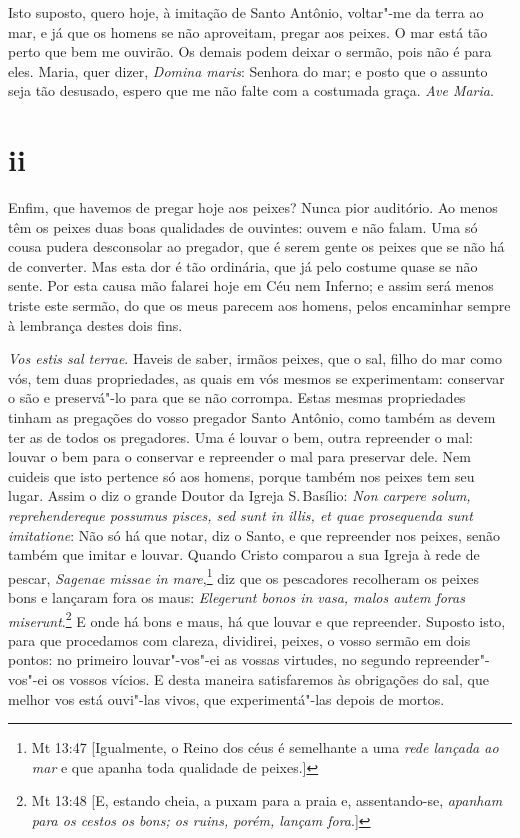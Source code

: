 Isto suposto, quero hoje, à imitação de Santo Antônio, voltar"-me da
terra ao mar, e já que os homens se não aproveitam, pregar aos peixes. O
mar está tão perto que bem me ouvirão. Os demais podem deixar o sermão,
pois não é para eles. Maria, quer dizer, \emph{Domina maris}: Senhora
do mar; e posto que o assunto seja tão desusado, espero que me não
falte com a costumada graça. \emph{Ave Maria}.

\section*{ii}

Enfim, que havemos de pregar hoje aos peixes? Nunca pior auditório. Ao
menos têm os peixes duas boas qualidades de ouvintes: ouvem e não falam.
Uma só cousa pudera desconsolar ao pregador, que é serem gente os peixes
que se não há de converter. Mas esta dor é tão ordinária, que já pelo
costume quase se não sente. Por esta causa mão falarei hoje em Céu nem
Inferno; e assim será menos triste este sermão, do que os meus parecem
aos homens, pelos encaminhar sempre à lembrança destes dois fins.

\emph{Vos estis sal terrae}. Haveis de saber, irmãos peixes, que o sal,
filho do mar
como vós, tem duas propriedades, as quais em vós mesmos se experimentam:
conservar o são e preservá"-lo para que se não corrompa. Estas mesmas
propriedades tinham as pregações do vosso pregador Santo Antônio, como
também as devem ter as de todos os pregadores. Uma é louvar o bem, outra
repreender o mal: louvar o bem para o conservar e repreender o mal para
preservar dele. Nem cuideis que isto pertence só aos homens, porque
também nos peixes tem seu lugar. Assim o diz o grande Doutor da Igreja
S.\,Basílio: \emph{Non carpere solum, reprehendereque possumus pisces,
sed sunt in illis, et quae prosequenda sunt imitatione}: Não só há que
notar, diz o Santo, e que repreender nos peixes, senão também que imitar
e louvar. Quando Cristo comparou a sua Igreja à rede de pescar,
\emph{Sagenae missae in mare},\footnote{Mt 13:47 [Igualmente, o Reino dos céus é semelhante a uma \emph{rede lançada ao mar} e que apanha toda qualidade de peixes.]} diz que os pescadores recolheram os
peixes bons e lançaram fora os maus: \emph{Elegerunt bonos in vasa,
malos autem foras miserunt}.\footnote{Mt 13:48 [E, estando cheia, a puxam para a praia e, assentando-se, \emph{apanham para os cestos os bons; os ruins, porém, lançam fora}.]} E onde há bons e maus, há que louvar e que
repreender. Suposto isto,
para que procedamos com clareza, dividirei, peixes, o vosso sermão em
dois pontos: no primeiro louvar"-vos"-ei as vossas virtudes, no segundo
repreender"-vos"-ei os vossos vícios. E desta maneira satisfaremos às
obrigações do sal, que melhor vos está ouvi"-las vivos, que
experimentá"-las depois de mortos.

